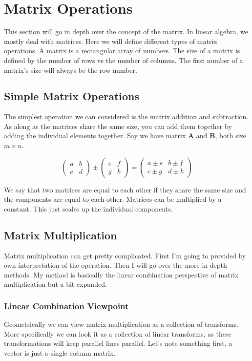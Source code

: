 \chapter{Matrix Operations}
This section will go in depth over the concept of the matrix. In linear algebra, we mostly deal with matrices. Here we will define different types of matrix operations. A matrix is a rectangular array of numbers. The size of a matrix is defined by the number of rows vs the number of columns. The first number of a matrix's size will always be the row number. 

\section{Simple Matrix Operations}
The simplest operation we can considered is the matrix addition and subtraction. As along as the matrices share the same size, you can add them together by adding the individual elements together. Say we have matrix \textbf{A} and \textbf{B}, both size $m \times n$. 

\begin{equation*}
	\begin{pmatrix}
		a & b \\ 
		c & d 
	\end{pmatrix} \pm 
	\begin{pmatrix}
		e & f \\ 
		g & h 
	\end{pmatrix} = 
	\begin{pmatrix}
		a \pm e & b \pm f \\ 
		c \pm g & d \pm h  
	\end{pmatrix}
\end{equation*}

We say that two matrices are equal to each other if they share the same size and the components are equal to each other. Matrices can be multiplied by a constant. This just scales up the individual components. 

\section{Matrix Multiplication}
Matrix multiplication can get pretty complicated. First I'm going to provided by own interpretation of the operation. Then I will go over the more in depth methods. My method is basically the linear combination perspective of matrix multiplication but a bit expanded. 

\pagebreak
\subsection{Linear Combination Viewpoint}
Geometrically we can view matrix multiplication as a collection of transforms. More specifically we can look it as a collection of linear transforms, as these transformations will keep parallel lines parallel. Let's note something first, a vector is just a single column matrix.

